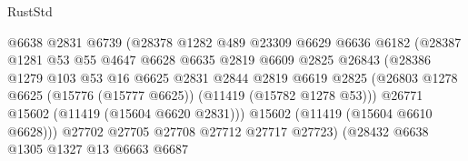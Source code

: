 \begin{lexlean}{RustStd}
\begin{coremodule}
                                    @6638
                                    @2831
                                    @6739
                                    (@28378
                                      @1282
                                      @489
                                      @23309
                                      @6629
                                      @6636
                                      @6182
                                      (@28387
                                        @1281
                                        @53
                                        @55
                                        @4647
                                        @6628
                                        @6635
                                        @2819
                                        @6609
                                        @2825
                                        @26843
                                        (@28386
                                          @1279
                                          @103
                                          @53
                                          @16
                                          @6625
                                          @2831
                                          @2844
                                          @2819
                                          @6619
                                          @2825
                                          (@26803
                                            @1278
                                            @6625
                                            (@15776 (@15777 @6625))
                                            (@11419 (@15782 @1278 @53)))
                                          @26771
                                          @15602
                                          (@11419 (@15604 @6620 @2831)))
                                        @15602
                                        (@11419 (@15604 @6610 @6628)))
                                      @27702
                                      @27705
                                      @27708
                                      @27712
                                      @27717
                                      @27723)
                                    (@28432
                                      @6638
                                      @1305
                                      @1327
                                      @13
                                      @6663
                                      @6687

\end{coremodule}
\end{lexlean}

